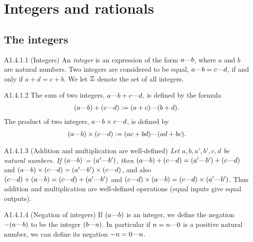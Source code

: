 \section{Integers and rationals}
\subsection{The integers}
\begin{definition}{A1.4.1.1}
    (Integers) An \emph{integer} is an expression of the form $a\text{\textemdash} b$, where $a$ and $b$ are natural numbers.
    Two integers are considered to be equal, $a\text{\textemdash} b=c\text{\textemdash} d$, if and only if $a+d=c+b$. We let $\mathbb{Z}$ denote
    the set of all integers.
\end{definition}

\begin{definition}{A1.4.1.2}
    The sum of two integers, $a\text{\textemdash} b + c\text{\textemdash} d$, is defined by the formula
    \begin{align*}
        (a\text{\textemdash} b) + (c\text{\textemdash} d) := (a+c)\text{\textemdash}(b+d).
    \end{align*}
    The product of two integers, $a\text{\textemdash} b \times c\text{\textemdash} d$, is defined by
    \begin{align*}
        (a\text{\textemdash} b) \times (c\text{\textemdash} d) := (ac+bd)\text{\textemdash}(ad+bc).
    \end{align*}
\end{definition}

\begin{lemma}{A1.4.1.3}
    (Addition and multiplication are well-defined) \emph{Let $a, b, a', b', c, d$ be natural numbers.
    If $(a\text{\textemdash} b)$ = $(a'\text{\textemdash} b')$, then $(a\text{\textemdash} b) + (c\text{\textemdash} d) = (a'\text{\textemdash} b') + (c\text{\textemdash} d)$}
    and $(a\text{\textemdash} b) \times (c\text{\textemdash} d) = (a'\text{\textemdash} b') \times (c\text{\textemdash} d)$, and also
    $(c\text{\textemdash} d) + (a\text{\textemdash} b) = (c\text{\textemdash} d) + (a'\text{\textemdash} b')$ and
    $(c\text{\textemdash} d) \times (a\text{\textemdash} b) = (c\text{\textemdash} d) \times (a'\text{\textemdash} b')$.
    Thus addition and multiplication are well-defined operations (equal inputs give equal outputs).
\end{lemma}

\begin{definition}{A1.4.1.4}
    (Negation of integers) If $(a\text{\textemdash} b)$ is an integer, we define the negation $-(a\text{\textemdash} b)$ to be the integer
    $(b\text{\textemdash} a)$.
    In particular if $n=n\text{\textemdash} 0$ is a positive natural number, we can define its negation $-n=0\text{\textemdash} n$.
\end{definition}

